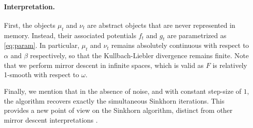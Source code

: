 \paragraph{Interpretation.} First, the objects $\mu_t$
and $\nu_t$ are abstract objects that are never represented in memory. Instead,
their associated potentials $f_t$ and $g_t$ are parametrized as
\eqref{eq:param}. In particular, $\mu_t$ and $\nu_t$ remains absolutely
continuous with respect to $\alpha$ and $\beta$ respectively, so that the
Kullbach-Liebler divergence remains finite. Note that we perform mirror descent
in infinite spaces, which is valid as $F$ is relatively 1-smooth with respect to
$\omega$.

Finally, we mention that in the absence of noise, and with constant step-size of
$1$, the algorithm recovers exactly the simultaneous Sinkhorn iterations. This
provides a new point of view on the Sinkhorn algorithm, distinct from other
mirror descent interpretations \citep{}. 




















